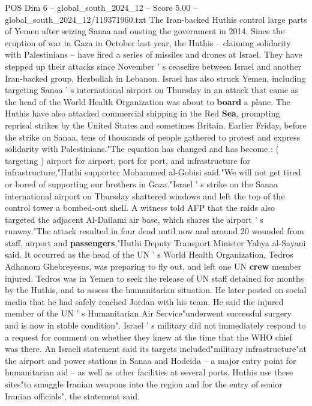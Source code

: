 \begin{textsample}{POS Dim 6 – global\_south\_2024\_12 – Score 5.00 – global\_south\_2024\_12/119371960.txt}  \label{ex:f6_pos_428}
The Iran-backed Huthis control large parts of Yemen after seizing Sanaa and ousting the government in 2014.
Since the eruption of war in Gaza in October last year, the Huthis -- claiming solidarity with Palestinians -- have fired a series of missiles and drones at Israel.
They have stepped up their attacks since November ' s ceasefire between Israel and another Iran-backed group, Hezbollah in Lebanon.
Israel has also struck Yemen, including targeting Sanaa ' s international airport on Thursday in an attack that came as the head of the World Health Organization was about to \textbf{board} a plane.
The Huthis have also attacked commercial shipping in the Red \textbf{Sea}, prompting reprisal strikes by the United States and sometimes Britain.
Earlier Friday, before the strike on Sanaa, tens of thousands of people gathered to protest and express solidarity with Palestinians."The equation has changed and has become : ( targeting ) airport for airport, port for port, and infrastructure for infrastructure,"Huthi supporter Mohammed al-Gobisi said."We will not get tired or bored of supporting our brothers in Gaza."Israel ' s strike on the Sanaa international airport on Thursday shattered windows and left the top of the control tower a bombed-out shell.
A witness told AFP that the raids also targeted the adjacent Al-Dailami air base, which shares the airport ' s runway."The attack resulted in four dead until now and around 20 wounded from staff, airport and \textbf{passengers},"Huthi Deputy Transport Minister Yahya al-Sayani said.
It occurred as the head of the UN ' s World Health Organization, Tedros Adhanom Ghebreyesus, was preparing to fly out, and left one UN \textbf{crew} member injured.
Tedros was in Yemen to seek the release of UN staff detained for months by the Huthis, and to assess the humanitarian situation.
He later posted on social media that he had safely reached Jordan with his team.
He said the injured member of the UN ' s Humanitarian Air Service"underwent successful surgery and is now in stable condition".
Israel ' s military did not immediately respond to a request for comment on whether they knew at the time that the WHO chief was there.
An Israeli statement said its targets included"military infrastructure"at the airport and power stations in Sanaa and Hodeida -- a major entry point for humanitarian aid -- as well as other facilities at several ports.
Huthis use these sites"to smuggle Iranian weapons into the region and for the entry of senior Iranian officials", the statement said.

\end{textsample}
